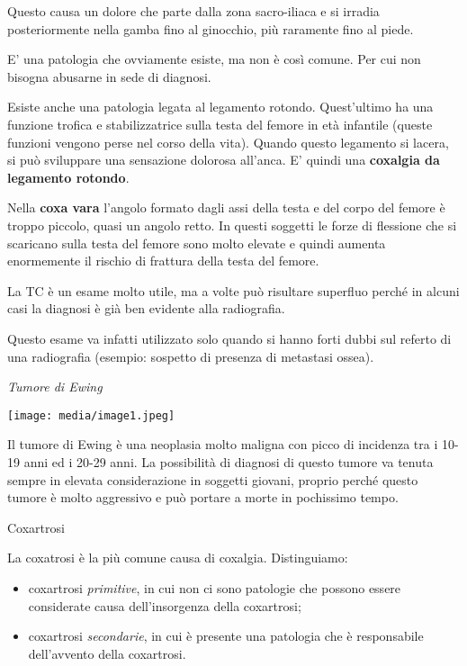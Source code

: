 \documentclass[]{article}
\begin{document}
Questo causa un dolore che parte dalla zona sacro-iliaca e si irradia
posteriormente nella gamba fino al ginocchio, più raramente fino al
piede.

E' una patologia che ovviamente esiste, ma non è così comune. Per cui
non bisogna abusarne in sede di diagnosi.

Esiste anche una patologia legata al legamento rotondo. Quest'ultimo ha
una funzione trofica e stabilizzatrice sulla testa del femore in età
infantile (queste funzioni vengono perse nel corso della vita). Quando
questo legamento si lacera, si può sviluppare una sensazione dolorosa
all'anca. E' quindi una \textbf{coxalgia da legamento rotondo}.

Nella \textbf{coxa vara} l'angolo formato dagli assi della testa e del
corpo del femore è troppo piccolo, quasi un angolo retto. In questi
soggetti le forze di flessione che si scaricano sulla testa del femore
sono molto elevate e quindi aumenta enormemente il rischio di frattura
della testa del femore.

La TC è un esame molto utile, ma a volte può risultare superfluo perché
in alcuni casi la diagnosi è già ben evidente alla radiografia.

Questo esame va infatti utilizzato solo quando si hanno forti dubbi sul
referto di una radiografia (esempio: sospetto di presenza di metastasi
ossea).

\emph{Tumore di Ewing}

\texttt{[image: media/image1.jpeg]}

Il tumore di Ewing è una neoplasia molto maligna con picco di incidenza
tra i 10-19 anni ed i 20-29 anni. La possibilità di diagnosi di questo
tumore va tenuta sempre in elevata considerazione in soggetti giovani,
proprio perché questo tumore è molto aggressivo e può portare a morte in
pochissimo tempo.

Coxartrosi

La coxatrosi è la più comune causa di coxalgia. Distinguiamo:

\begin{itemize}
\item
  coxartrosi \emph{primitive}, in cui non ci sono patologie che possono
  essere considerate causa dell'insorgenza della coxartrosi;
\item
  coxartrosi \emph{secondarie}, in cui è presente una patologia che è
  responsabile dell'avvento della coxartrosi.
\end{itemize}
\end{document}
